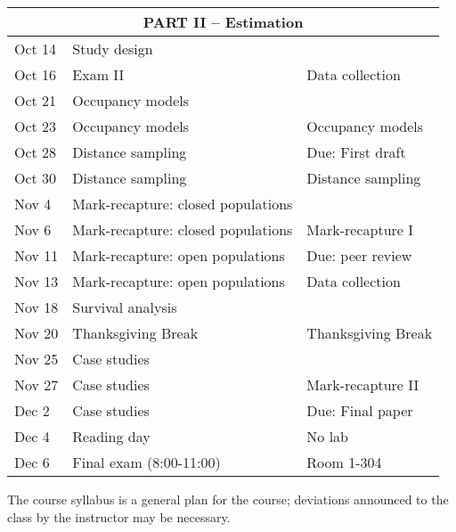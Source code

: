 \documentclass[12pt]{article}
\begin{document}
\begin{center}
\begin{tabular}[c]{lll}
\hline
           \multicolumn{3}{c}{PART II -- Estimation}                                   \\
\hline
Oct 14     & Study design                       &                                      \\
Oct 16     & Exam II                            & Data collection                      \\
\hline
Oct 21     & Occupancy models                   &                                      \\
Oct 23     & Occupancy models                   & Occupancy models                     \\
\hline
Oct 28     & Distance sampling                  & Due: First draft                     \\
Oct 30     & Distance sampling                  & Distance sampling                    \\
\hline
Nov 4      & Mark-recapture: closed populations &                                      \\
Nov 6      & Mark-recapture: closed populations & Mark-recapture I                     \\
\hline
Nov 11     & Mark-recapture: open populations   & Due: peer review                     \\
Nov 13     & Mark-recapture: open populations   & Data collection                      \\
\hline
Nov 18     & Survival analysis                  &                                      \\
Nov 20     & Thanksgiving Break                 & Thanksgiving Break                   \\
\hline
Nov 25     & Case studies                       &                                      \\
Nov 27     & Case studies                       & Mark-recapture II                    \\
\hline
Dec 2      & Case studies                       & Due: Final paper                     \\
Dec 4      & Reading day                        & No lab                               \\
\hline
Dec 6     & Final exam (8:00-11:00)            &  Room 1-304                                 \\
\hline \hline
\end{tabular}
\end{center}

The course syllabus is a general plan for the course; deviations announced to the class by the instructor may be necessary.
\end{document}
